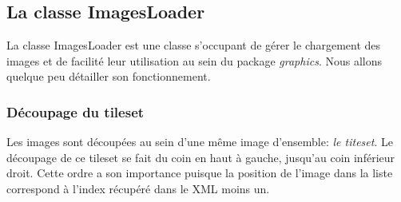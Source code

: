 \documentclass[a4paper,12pt]{article} %
\begin{document}
\subsection{La classe ImagesLoader}
La classe ImagesLoader est une classe s’occupant de gérer le chargement des images et de facilité leur utilisation au sein du package \textit{graphics}. Nous allons quelque peu détailler son fonctionnement.
\subsubsection{Découpage du tileset}
Les images sont découpées au sein d'une même image d'ensemble: \textit{le titeset}. Le découpage de ce tileset se fait du coin en haut à gauche, jusqu'au coin inférieur droit. Cette ordre a son importance puisque la position de l'image dans la liste correspond à l'index récupéré dans le XML moins un.
\end{document}
